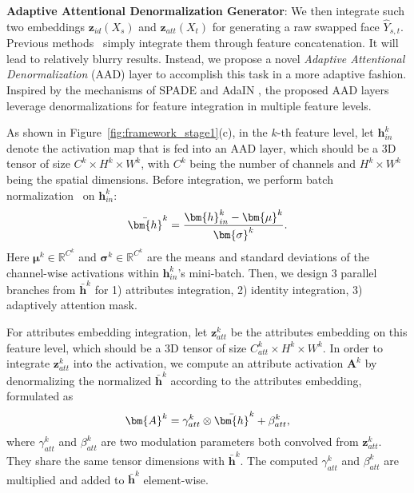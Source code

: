 \noindent\textbf{Adaptive Attentional Denormalization Generator}:
We then integrate such two embeddings $\bm{z}_{id}(X_s)$ and $\bm{z}_{att}(X_t)$ for generating a raw swapped face $\hat{Y}_{s,t}$.
Previous methods~\cite{Bao_ipgan,natsume2018rsgan} simply integrate them through feature concatenation. It will lead to relatively blurry results.
Instead, we propose a novel \emph{Adaptive Attentional Denormalization} (AAD) layer to accomplish this task in a more adaptive fashion.
Inspired by the mechanisms of SPADE \cite{park2019semantic} and AdaIN \cite{dumoulin2016learned, huang2017arbitrary}, the proposed AAD layers leverage denormalizations for feature integration in multiple feature levels.

As shown in Figure~\ref{fig:framework_stage1}(c), in the $k$-th feature level, 
let $\bm{h}_{in}^k$ denote the activation map that is fed into an AAD layer, which should be a 3D tensor of size $C^k \times H^k \times W^k$, with $C^k$ being the number of channels and $H^k \times W^k$ being the spatial dimensions.
Before integration, we perform batch normalization~\cite{bn} on $\bm{h}_{in}^k$: 
\vspace{-0.5em}
\begin{equation}
\vspace{-0.5em}
\label{eqn:IN}
\bar{\bm{h}}^k = \frac{\bm{h}_{in}^k - \bm{\mu}^k}{\bm{\sigma}^k}.
\end{equation}
Here $\bm{\mu}^k \in \mathbb{R}^{C^k}$ and $\bm{\sigma}^k \in \mathbb{R}^{C^k}$ are the means and standard deviations of the channel-wise activations within $\bm{h}_{in}^k$'s mini-batch. Then, we design 3 parallel branches from $\bar{\bm{h}}^k$ for 1) attributes integration, 2) identity integration, 3) adaptively attention mask.

For attributes embedding integration, let $\bm{z}_{att}^k$ be the attributes embedding on this feature level, which should be a 3D tensor of size $C^k_{att} \times H^k \times W^k$.
In order to integrate $\bm{z}_{att}^k$ into the activation, we compute an attribute activation $\bm{A}^k$ by denormalizing the normalized $\bar{\bm{h}}^k$ according to the attributes embedding, formulated as
\vspace{-0.5em}
\begin{equation}
\vspace{-0.5em}
\label{eqn:SPADE}
\bm{A}^k = \gamma^k_{att} \otimes \bar{\bm{h}}^k + \beta_{att}^k,
\end{equation}
where $\gamma^k_{att}$ and $\beta^k_{att}$ are two modulation parameters both convolved from $\bm{z}^k_{att}$. They share the same tensor dimensions with $\bar{\bm{h}}^k$. 
The computed $\gamma^k_{att}$ and $\beta^k_{att}$ are multiplied and added to $\bar{\bm{h}}^k$ element-wise.

